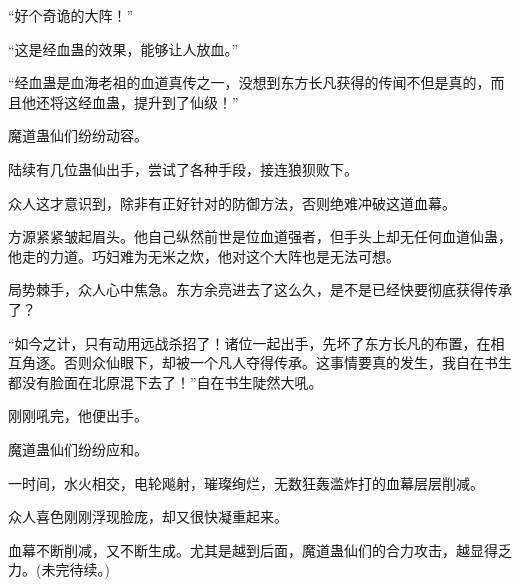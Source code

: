 \begin{this_body}
“好个奇诡的大阵！”

“这是经血蛊的效果，能够让人放血。”

“经血蛊是血海老祖的血道真传之一，没想到东方长凡获得的传闻不但是真的，而且他还将这经血蛊，提升到了仙级！”

魔道蛊仙们纷纷动容。

陆续有几位蛊仙出手，尝试了各种手段，接连狼狈败下。

众人这才意识到，除非有正好针对的防御方法，否则绝难冲破这道血幕。

方源紧紧皱起眉头。他自己纵然前世是位血道强者，但手头上却无任何血道仙蛊，他走的力道。巧妇难为无米之炊，他对这个大阵也是无法可想。

局势棘手，众人心中焦急。东方余亮进去了这么久，是不是已经快要彻底获得传承了？

“如今之计，只有动用远战杀招了！诸位一起出手，先坏了东方长凡的布置，在相互角逐。否则众仙眼下，却被一个凡人夺得传承。这事情要真的发生，我自在书生都没有脸面在北原混下去了！”自在书生陡然大吼。

刚刚吼完，他便出手。

魔道蛊仙们纷纷应和。

一时间，水火相交，电轮飚射，璀璨绚烂，无数狂轰滥炸打的血幕层层削减。

众人喜色刚刚浮现脸庞，却又很快凝重起来。

血幕不断削减，又不断生成。尤其是越到后面，魔道蛊仙们的合力攻击，越显得乏力。(未完待续。)

\end{this_body}

